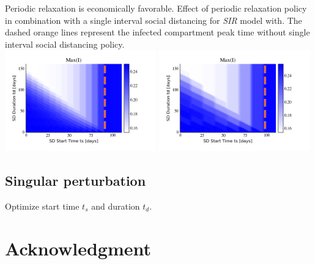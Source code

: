 \documentclass[10pt]{beamer}
\begin{document}
\begin{frame}{Periodic relaxation is economically favorable.}
	Effect of periodic relaxation policy in combination with a single interval social distancing for \textit{SIR} model with. The dashed orange lines represent the infected compartment peak time without single interval social distancing policy. \\ \vspace{0.5cm}
	\includegraphics[width=0.49\textwidth]{epidemic-sp-heatmap1.png}
	\includegraphics[width=0.49\textwidth]{epidemic-sp-heatmap2.png} 
\end{frame}

\subsection{Singular perturbation}
\begin{frame}{Optimize start time $t_s$ and duration $t_d$.}
	
\end{frame}

\section{Acknowledgment}
\end{document}
